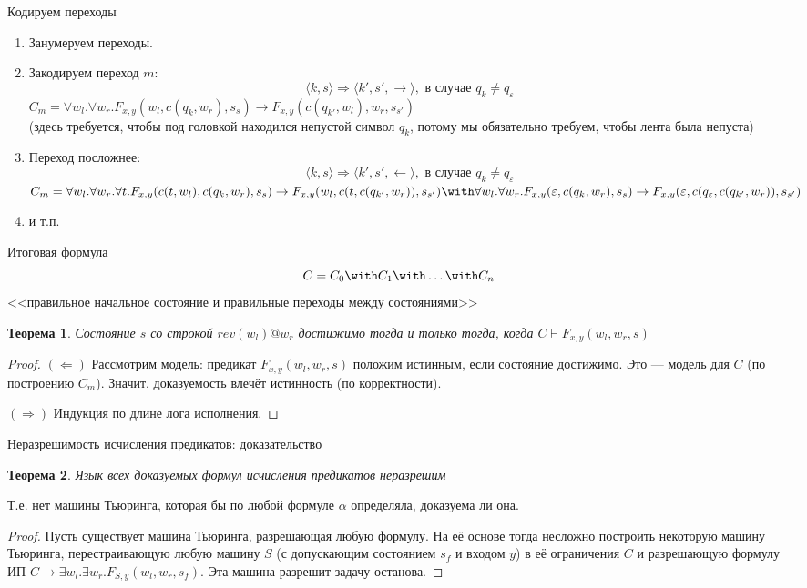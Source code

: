 \documentclass[handout]{beamer}
\newtheorem{thm}{Теорема}[section]
\begin{document}
\begin{frame}{Кодируем переходы}
\begin{enumerate}
\item Занумеруем переходы.\pause
\item Закодируем переход $m$: $$\langle k, s \rangle \Rightarrow \langle k', s', \rightarrow \rangle, \text{ в случае } q_k \ne q_\varepsilon$$
$C_m = \forall w_l.\forall w_r.F_{x,y}(w_l,c(q_k,w_r),s_s) \rightarrow F_{x,y}(c(q_{k'},w_l),w_r,s_{s'})$\\
(здесь требуется, чтобы под головкой находился непустой символ $q_k$, потому мы обязательно требуем, чтобы лента была
непуста)\pause

\item Переход посложнее:
$$\langle k, s \rangle \Rightarrow \langle k', s', \leftarrow \rangle, \text{ в случае } q_k \ne q_\varepsilon$$
$C_m = \forall w_l.\forall w_r.\forall t.F_{x,y}(c(t,w_l),c(q_k,w_r),s_s) \rightarrow F_{x,y}(w_l,c(t,c(q_{k'},w_r)),s_{s'}) \with
\forall w_l.\forall w_r.F_{x,y}(\varepsilon,c(q_k,w_r),s_s) \rightarrow F_{x,y}(\varepsilon,c(q_\varepsilon,c(q_{k'},w_r)),s_{s'})$\\
\pause
\item и т.п.
\end{enumerate}
\end{frame}

\begin{frame}{Итоговая формула}
$$C = C_0 \with C_1 \with \dots \with C_n$$
<<правильное начальное состояние и правильные переходы между состояниями>>\pause

\begin{thm}
Состояние $s$ со строкой $rev(w_l)@w_r$ достижимо тогда и только тогда, когда
$C \vdash F_{x,y}(w_l,w_r,s)$\pause
\end{thm}
\begin{proof}
$(\Leftarrow)$ Рассмотрим модель: предикат $F_{x,y}(w_l,w_r,s)$ положим истинным, если состояние достижимо. \pause
Это --- модель для $C$ (по построению $C_m$). \pause
Значит, доказуемость влечёт истинность (по корректности). \pause

$(\Rightarrow)$ Индукция по длине лога исполнения.
\end{proof}
\end{frame}

\begin{frame}{Неразрешимость исчисления предикатов: доказательство}
\begin{thm}Язык всех доказуемых формул исчисления предикатов неразрешим\end{thm}
Т.е. нет машины Тьюринга, которая бы по любой формуле $\alpha$ определяла, доказуема ли она.\pause
\begin{proof} Пусть существует машина Тьюринга, разрешающая любую формулу. \pause%
На её основе тогда несложно построить некоторую машину Тьюринга, перестраивающую любую машину $S$ (с допускающим состоянием $s_f$ и входом $y$) 
в её ограничения $C$ и разрешающую формулу ИП $C \rightarrow \exists w_l.\exists w_r.F_{S,y}(w_l,w_r,s_f)$. 
Эта машина разрешит задачу останова.
\end{proof}
\end{frame}
\end{document}
